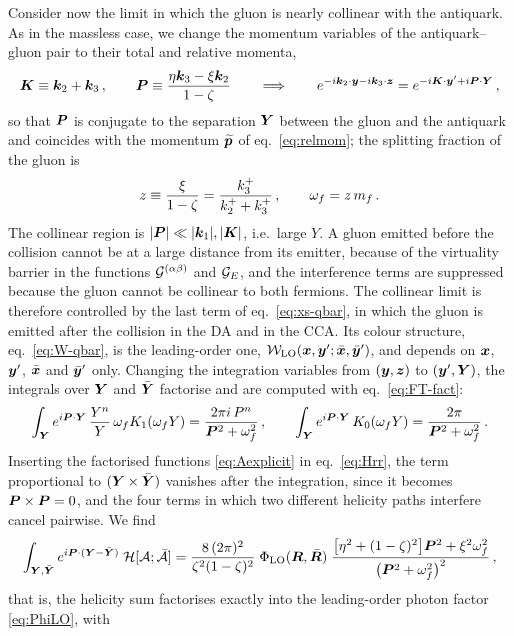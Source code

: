 Consider now the limit in which the gluon is nearly collinear with the antiquark. As in the massless
case, we change the momentum variables of the antiquark--gluon pair to their total and relative
momenta,
\begin{equation}
\bm{K}\equiv\bm{k}_2+\bm{k}_3\,,\qquad\bm{P}\equiv\frac{\eta\bm{k}_3-\xi\bm{k}_2}{1-\zeta}\qquad\Longrightarrow\qquad
e^{-i\bm{k}_2\cdot\bm{y}-i\bm{k}_3\cdot\bm{z}}=e^{-i\bm{K}\cdot\bm{y}'+i\bm{P}\cdot\bm{Y}}\,,
\end{equation}
so that $\bm{P}$ is conjugate to the separation $\bm{Y}$ between the gluon and the antiquark and coincides
with the momentum $\widetilde{\bm{p}}$ of eq.~\eqref{eq:relmom}; the splitting fraction of the gluon is
\begin{equation}
z\equiv\frac{\xi}{1-\zeta}=\frac{k_3^+}{k_2^++k_3^+}\,,\qquad\omega_f=z\,m_f\,.
\end{equation}
The collinear region is $|\bm{P}|\ll|\bm{k}_1|,|\bm{K}|$, i.e.\ large $Y$. A gluon emitted before the collision
cannot be at a large distance from its emitter, because of the virtuality barrier in the functions
$\mathcal{G}^{(\alpha\beta)}$ and $\mathcal{G}_E$, and the interference terms are suppressed because the gluon cannot be
collinear to both fermions. The collinear limit is therefore controlled by the last term of
eq.~\eqref{eq:xs-qbar}, in which the gluon is emitted after the collision in the DA and in the CCA.
Its colour structure, eq.~\eqref{eq:W-qbar}, is the leading-order one, $\mathcal{W}_{\rm LO}(\bm{x},\bm{y}';\bar{\bm{x}},\bar{\bm{y}}')$,
and depends on $\bm{x}$, $\bm{y}'$, $\bar{\bm{x}}$ and $\bar{\bm{y}}'$ only. Changing the integration variables from $(\bm{y},\bm{z})$ to
$(\bm{y}',\bm{Y})$, the integrals over $\bm{Y}$ and $\bar{\bm{Y}}$ factorise and are computed with eq.~\eqref{eq:FT-fact}:
\begin{equation}
\int_{\bm{Y}}e^{i\bm{P}\cdot\bm{Y}}\,\frac{Y^n}{Y}\,\omega_f K_1(\omega_f Y)=\frac{2\pi i\,P^n}{\bm{P}^2+\omega_f^2}\,,\qquad
\int_{\bm{Y}}e^{i\bm{P}\cdot\bm{Y}}\,K_0(\omega_f Y)=\frac{2\pi}{\bm{P}^2+\omega_f^2}\,.
\end{equation}
Inserting the factorised functions \eqref{eq:Aexplicit} in eq.~\eqref{eq:Hrr}, the term proportional to
$(\bm{Y}\times\bar{\bm{Y}})$ vanishes after the integration, since it becomes $\bm{P}\times\bm{P}=0$, and the four terms in
which two different helicity paths interfere cancel pairwise. We find
\begin{equation}
\int_{\bm{Y},\bar{\bm{Y}}}e^{i\bm{P}\cdot(\bm{Y}-\bar{\bm{Y}})}\;\mathcal{H}[\mathcal{A};\bar{\mathcal{A}}]
=\frac{8\,(2\pi)^2}{\zeta^2(1-\zeta)^2}\;\Phi_{\rm LO}(\bm{R},\bar{\bm{R}})\;
\frac{\big[\eta^2+(1-\zeta)^2\big]\bm{P}^2+\xi^2\omega_f^2}{\big(\bm{P}^2+\omega_f^2\big)^2}\,,
\label{eq:coll-H}
\end{equation}
that is, the helicity sum factorises exactly into the leading-order photon factor \eqref{eq:PhiLO}, with
